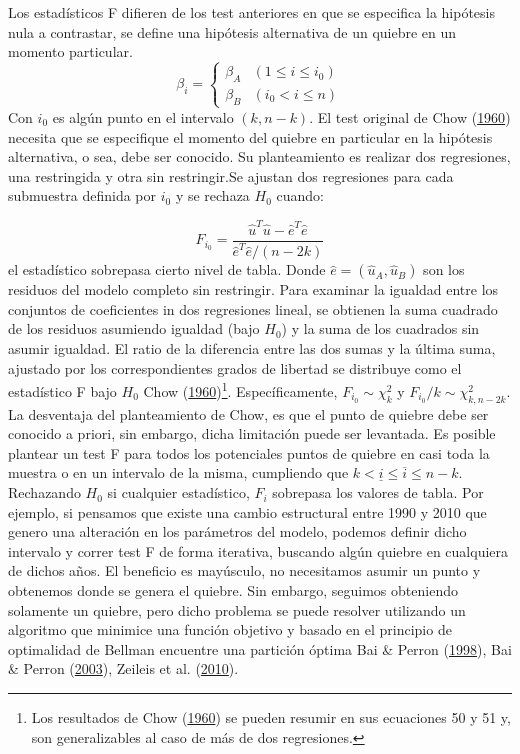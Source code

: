 \documentclass[12pt,oneside]{reedthesis}
\begin{document}
Los estadísticos F difieren de los test anteriores en que se especifica la hipótesis nula a contrastar, se define una hipótesis alternativa de un quiebre en un momento particular.
\begin{equation}
\beta_i = \begin{cases} 
\beta_A &(1 \leq i \leq i_0) \\
\beta_B &(i_0 < i \leq n)
\end{cases}
\end{equation}
Con \(i_0\) es algún punto en el intervalo \((k, n-k)\). El test original de Chow (\protect\hyperlink{ref-Chow1960}{1960}) necesita que se especifique el momento del quiebre en particular en la hipótesis alternativa, o sea, debe ser conocido. Su planteamiento es realizar dos regresiones, una restringida y otra sin restringir.Se ajustan dos regresiones para cada submuestra definida por \(i_0\) y se rechaza \(H_0\) cuando:

\[
F_{i_0} = \frac{\hat{u}^T\hat{u}-\hat{e}^T\hat{e}} {\hat{e}^T\hat{e}/(n-2k)}
\]
el estadístico sobrepasa cierto nivel de tabla. Donde \(\hat{e}=(\hat{u}_A,\hat{u}_B)\) son los residuos del modelo completo sin restringir. Para examinar la igualdad entre los conjuntos de coeficientes in dos regresiones lineal, se obtienen la suma cuadrado de los residuos asumiendo igualdad (bajo \(H_0\)) y la suma de los cuadrados sin asumir igualdad. El ratio de la diferencia entre las dos sumas y la última suma, ajustado por los correspondientes grados de libertad se distribuye como el estadístico F bajo \(H_0\) Chow (\protect\hyperlink{ref-Chow1960}{1960})\footnote{Los resultados de Chow (\protect\hyperlink{ref-Chow1960}{1960}) se pueden resumir en sus ecuaciones 50 y 51 y, son generalizables al caso de más de dos regresiones.}. Específicamente, \(F_{i_0} \sim \chi^2_k\) y \(F_{i_0}/k \sim \chi^2_{k, n-2k}\). La desventaja del planteamiento de Chow, es que el punto de quiebre debe ser conocido a priori, sin embargo, dicha limitación puede ser levantada. Es posible plantear un test F para todos los potenciales puntos de quiebre en casi toda la muestra o en un intervalo de la misma, cumpliendo que \(k < \underline i \leq \overline i \leq n-k\). Rechazando \(H_0\) si cualquier estadístico, \(F_i\) sobrepasa los valores de tabla. Por ejemplo, si pensamos que existe una cambio estructural entre 1990 y 2010 que genero una alteración en los parámetros del modelo, podemos definir dicho intervalo y correr test F de forma iterativa, buscando algún quiebre en cualquiera de dichos años. El beneficio es mayúsculo, no necesitamos asumir un punto y obtenemos donde se genera el quiebre. Sin embargo, seguimos obteniendo solamente un quiebre, pero dicho problema se puede resolver utilizando un algoritmo que minimice una función objetivo y basado en el principio de optimalidad de Bellman encuentre una partición óptima Bai \& Perron (\protect\hyperlink{ref-BaiPerron1998}{1998}), Bai \& Perron (\protect\hyperlink{ref-BaiPerron2003}{2003}), Zeileis et al. (\protect\hyperlink{ref-Zeileis2010}{2010}).
\end{document}
